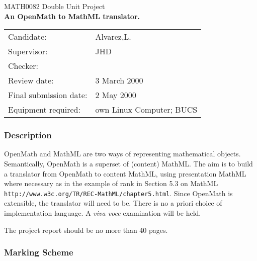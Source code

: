 \begin{center}
\large\sc
MATH0082 Double Unit Project			\\ [4ex]
\large\bf
An OpenMath to MathML translator.
\end{center}

\begin{center}\begin{tabular}{ll}
  Candidate: 		 &Alvarez,L.		\\	%
  Supervisor:		 &JHD			\\	%
  Checker:		 & 			\\	%
  Review date:		 &	3 March 2000	\\
  Final submission date: &	2 May 2000	\\
  Equipment required:	 &own Linux Computer; BUCS	\\	%
\end{tabular}\end{center}


\subsubsection{ Description}					%

OpenMath and MathML are two ways of representing mathematical objects. Semantically, OpenMath is a superset of (content) MathML. The aim is to
build a translator from OpenMath to content MathML, using presentation MathML where necessary as in the example of rank in Section 5.3 on MathML
{\tt http://www.w3c.org/TR/REC-MathML/chapter5.html}. Since OpenMath is extensible, the translator will need to be.  There is no a priori choice of
implementation language. A {\em viva voce} examination will be held.  %

The project report should be no more than 40 pages.


\vspace{2ex}
 \subsubsection{Marking Scheme}					

